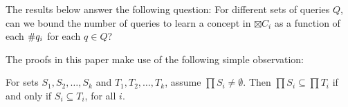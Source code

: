 The results below answer the following question:
For different sets of queries $Q$, can we bound the number of queries to learn a concept in $\boxtimes C_i $ as a function of each $\#q_{i}$ for each $q \in Q$?

The proofs in this paper make use of the following simple observation:
\begin{observation}
\label{subobs}
For sets $S_1, S_2, \dots, S_k$ and $T_1, T_2, \dots, T_k$, assume $\prod S_i \ne \emptyset$.  Then $\prod S_i \subseteq \prod T_i$ if and only if $S_i \subseteq T_i$, for all $i$.
\end{observation}
